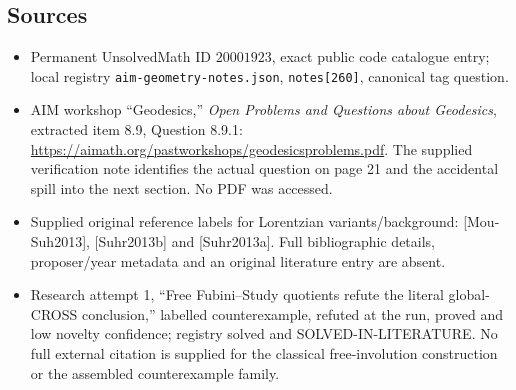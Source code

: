 \documentclass[11pt]{article}
\begin{document}
\subsection{Sources}
\begin{itemize}
\item Permanent UnsolvedMath ID \(20001923\), exact public code catalogue entry; local registry \texttt{aim-geometry-notes.json}, \texttt{notes[260]}, canonical tag question.
\item AIM workshop ``Geodesics,'' \emph{Open Problems and Questions about Geodesics}, extracted item 8.9, Question 8.9.1: \url{https://aimath.org/pastworkshops/geodesicsproblems.pdf}. The supplied verification note identifies the actual question on page 21 and the accidental spill into the next section. No PDF was accessed.
\item Supplied original reference labels for Lorentzian variants/background: [Mou-Suh2013], [Suhr2013b] and [Suhr2013a]. Full bibliographic details, proposer/year metadata and an original literature entry are absent.
\item Research attempt 1, ``Free Fubini--Study quotients refute the literal global-CROSS conclusion,'' labelled counterexample, refuted at the run, proved and low novelty confidence; registry solved and SOLVED-IN-LITERATURE. No full external citation is supplied for the classical free-involution construction or the assembled counterexample family.
\end{itemize}
\end{document}
